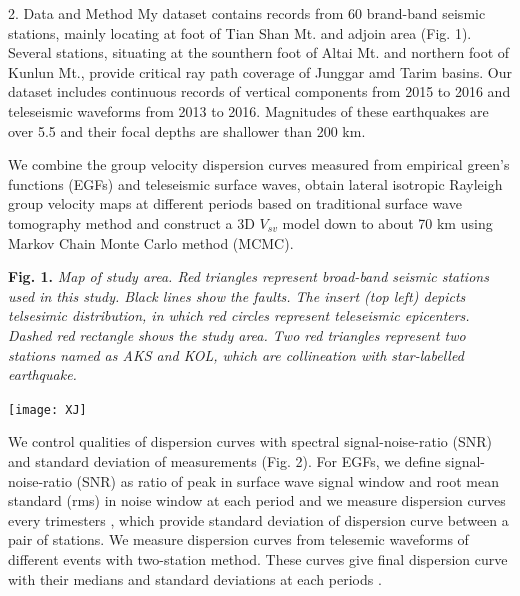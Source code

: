 \documentclass[
    landscape,      %
    paperwidth = 1200mm,
    paperheight = 900mm,
    fontscale = 0.4,
    margin = 1.7cm,
]{baposter}
\begin{document}
\begin{poster}
\begin{posterbox}[column=0, below=auto]{2. Data and Method}
\setlength{\parskip}{3pt}
My dataset contains records from 60 brand-band seismic stations, mainly
locating at foot of Tian Shan Mt. and adjoin area (Fig. 1).
Several stations, situating at the sounthern foot of Altai Mt. and northern foot of Kunlun Mt.,
provide critical ray path coverage of Junggar amd Tarim basins. Our dataset includes continuous records
of vertical components from 2015 to 2016 and teleseismic waveforms from 2013 to 2016.
Magnitudes of these earthquakes are over 5.5 and their focal depths are shallower than 200 km.

We combine the group velocity dispersion curves measured from empirical green's functions (EGFs) and teleseismic surface waves,
obtain lateral isotropic Rayleigh group velocity maps at different periods based on traditional surface wave tomography method
and  construct a 3D $V_{sv}$ model down to about 70 km using Markov Chain Monte Carlo method (MCMC).



\begin{center}

\begin{minipage}{0.2\textwidth}
\footnotesize
\textbf{Fig. 1.}
\itshape
Map of study area. Red triangles represent broad-band seismic stations
used in this study. Black lines show the faults.
The insert (top left) depicts telsesimic distribution, in which red circles represent
teleseismic epicenters.
Dashed red rectangle shows the study area. Two red triangles represent two stations
named as AKS and KOL, which are collineation with star-labelled earthquake.
\end{minipage}
\begin{minipage}{0.75\textwidth}
\texttt{[image: XJ]}
\end{minipage}
\hspace{0.1cm}

\end{center}

We control qualities of dispersion curves with spectral signal-noise-ratio (SNR) and standard deviation of measurements (Fig. 2).
For EGFs, we define signal-noise-ratio (SNR) as ratio of peak in surface wave signal window and root mean standard (rms) in noise window at each period and we measure dispersion curves every trimesters
, which provide standard deviation of dispersion curve between a pair of stations.
We measure dispersion curves from telesemic waveforms of different events with two-station method.
These curves give final dispersion curve with their medians and standard deviations at each periods .


\end{posterbox}
\end{poster}
\end{document}
